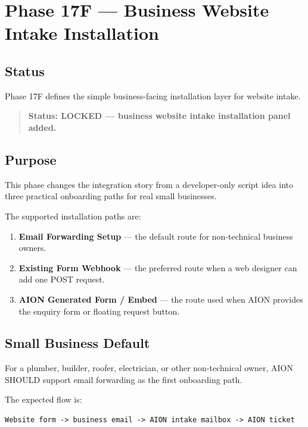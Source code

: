 \section{Phase 17F --- Business Website Intake Installation}
\label{sec:aion-phase17f-business-website-intake-installation}

\subsection{Status}

Phase 17F defines the simple business-facing installation layer for website intake.

\begin{quote}
\textbf{Status: LOCKED --- business website intake installation panel added.}
\end{quote}

\subsection{Purpose}

This phase changes the integration story from a developer-only script idea into three practical onboarding paths for real small businesses.

The supported installation paths are:

\begin{enumerate}
  \item \textbf{Email Forwarding Setup} --- the default route for non-technical business owners.
  \item \textbf{Existing Form Webhook} --- the preferred route when a web designer can add one POST request.
  \item \textbf{AION Generated Form / Embed} --- the route used when AION provides the enquiry form or floating request button.
\end{enumerate}

\subsection{Small Business Default}

For a plumber, builder, roofer, electrician, or other non-technical owner, AION SHOULD support email forwarding as the first onboarding path.

The expected flow is:

\begin{verbatim}
Website form -> business email -> AION intake mailbox -> AION ticket
\end{verbatim}

